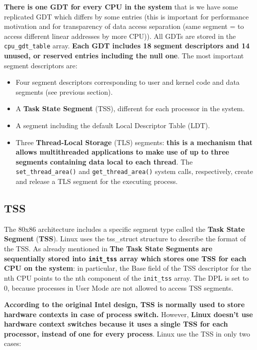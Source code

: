 \documentclass[10pt,a4paper]{article}
\begin{document}
\textbf{There is one GDT for every CPU in the system} that is we have some replicated GDT which differs by some entries (this is important for performance motivation and for transparency of data access separation (same segment = to access different linear addresses by more CPU)). All GDTs are stored in the \texttt{cpu\_gdt\_table} array.  \textbf{Each GDT includes 18 segment descriptors and 14 unused, or reserved entries including the null one}. The most important segment descriptors are:
\begin{itemize}
\item Four segment descriptors corresponding to user and kernel code and data segments (see previous section).
\item A \textbf{Task State Segment} (TSS), different for each processor in the system.
\item A segment including the default Local Descriptor Table (LDT).
\item Three \textbf{Thread-Local Storage} (TLS) segments: \textbf{this is a mechanism that allows multithreaded applications to make use of up to three segments containing data local to each thread}. The \texttt{set\_thread\_area()} and \texttt{get\_thread\_area()} system calls, respectively, create and release a TLS segment for the executing process.
\end{itemize}

\subsection{TSS}

The 80x86 architecture includes a specific segment type called the \textbf{Task State Segment} (\textbf{TSS}). Linux uses the tss\_struct structure to describe the format of the TSS. As already mentioned in
\textbf{The Task State Segments are sequentially stored into \texttt{init\_tss} array which stores one TSS for each CPU on the system}: in particular, the Base field of the TSS descriptor for the nth CPU points to the nth component of the \texttt{init\_tss} array. The DPL is set to 0, because processes in User Mode are not allowed to
access TSS segments.

\textbf{According to the original Intel design, TSS is normally used to store hardware contexts in case of process switch.} However, \textbf{Linux doesn't use hardware context switches because it uses a single TSS for each processor, instead of one for every process}. Linux use the TSS in only two cases:
\end{document}
